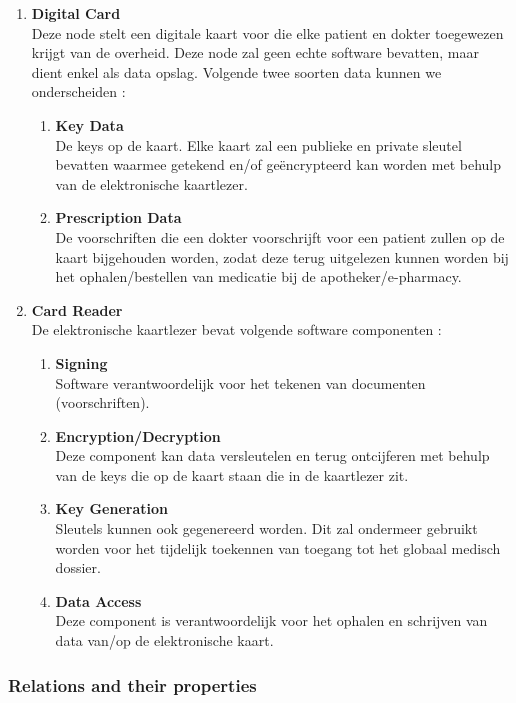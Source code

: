\documentclass[a4paper,10pt]{paper}
\begin{document}
\begin{enumerate}
 \item \textbf{Digital Card}\\
Deze node stelt een digitale kaart voor die elke patient en dokter toegewezen krijgt van de overheid. Deze node zal geen echte software bevatten, maar dient enkel als data opslag. Volgende twee soorten data kunnen we onderscheiden :
\begin{enumerate}
 \item \textbf{Key Data}\\
De keys op de kaart. Elke kaart zal een publieke en private sleutel bevatten waarmee getekend en/of geëncrypteerd kan worden met behulp van de elektronische kaartlezer.
\item \textbf{Prescription Data}\\
De voorschriften die een dokter voorschrijft voor een patient zullen op de kaart bijgehouden worden, zodat deze terug uitgelezen kunnen worden bij het ophalen/bestellen van medicatie bij de apotheker/e-pharmacy.
\end{enumerate}

\item \textbf{Card Reader}\\
De elektronische kaartlezer bevat volgende software componenten : 
\begin{enumerate}
\item \textbf{Signing}\\
Software verantwoordelijk voor het tekenen van documenten (voorschriften).
\item \textbf{Encryption/Decryption}\\
Deze component kan data versleutelen en terug ontcijferen met behulp van de keys die op de kaart staan die in de kaartlezer zit.
\item \textbf{Key Generation}\\
Sleutels kunnen ook gegenereerd worden. Dit zal ondermeer gebruikt worden voor het tijdelijk toekennen van toegang tot het globaal medisch dossier.
\item \textbf{Data Access}\\
Deze component is verantwoordelijk voor het ophalen en schrijven van data van/op de elektronische kaart.
\end{enumerate}

\end{enumerate}


\subsubsection{Relations and their properties}
\end{document}
